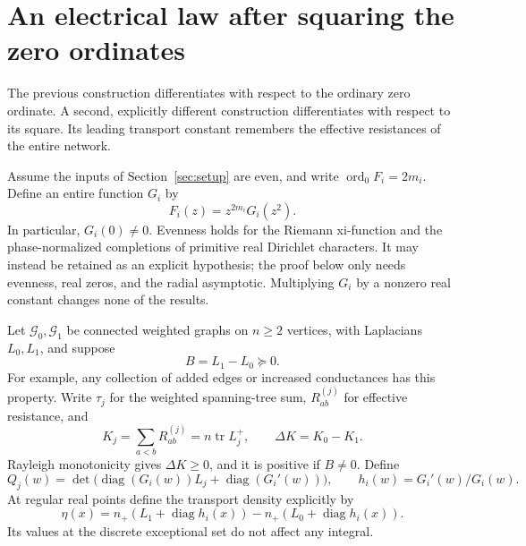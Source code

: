 \section{An electrical law after squaring the zero ordinates}
\label{sec:squared}

The previous construction differentiates with respect to the ordinary zero
ordinate.  A second, explicitly different construction differentiates with
respect to its square.  Its leading transport constant remembers the
effective resistances of the entire network.

Assume the inputs of Section~\ref{sec:setup} are even, and write
$\operatorname{ord}_0 F_i=2m_i$.  Define an entire function $G_i$ by
\begin{equation}\label{eq:squared-input}
 F_i(z)=z^{2m_i}G_i(z^2).
\end{equation}
In particular, $G_i(0)\ne0$.  Evenness holds for the Riemann xi-function
and the phase-normalized completions of primitive real Dirichlet
characters.  It may instead be retained as an explicit hypothesis; the
proof below only needs evenness, real zeros, and the radial asymptotic.
Multiplying $G_i$ by a nonzero real constant changes none of the results.

Let $\mathcal G_0,\mathcal G_1$ be connected weighted graphs on $n\ge2$ vertices, with
Laplacians $L_0,L_1$, and suppose
\[
 B=L_1-L_0\succeq0.
\]
For example, any collection of added edges or increased conductances
has this property.  Write $\tau_j$ for the weighted spanning-tree sum,
$R^{(j)}_{ab}$ for effective resistance, and
\begin{equation}\label{eq:kirchhoff-drop}
 K_j=\sum_{a<b}R^{(j)}_{ab}=n\operatorname{tr}L_j^+,
 \qquad \Delta K=K_0-K_1.
\end{equation}
Rayleigh monotonicity gives $\Delta K\ge0$, and it is positive if $B\ne0$.
Define
\[
 Q_j(w)=\det\bigl(\operatorname{diag}(G_i(w))L_j+
                         \operatorname{diag}(G_i'(w))\bigr),
 \qquad h_i(w)=G_i'(w)/G_i(w).
\]
At regular real points define the transport density explicitly by
\[
 \eta(x)=n_+\!\left(L_1+\operatorname{diag}h_i(x)\right)
           -n_+\!\left(L_0+\operatorname{diag}h_i(x)\right).
\]
Its values at the discrete exceptional set do not affect any integral.

